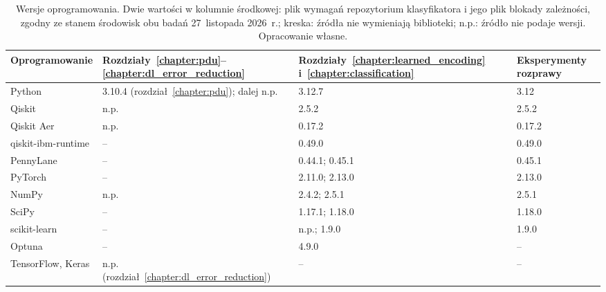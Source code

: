 \begin{table}[!tb]
\centering
\caption[Wersje oprogramowania]{Wersje oprogramowania.
Dwie wartości w kolumnie środkowej: plik wymagań repozytorium klasyfikatora i jego plik blokady zależności, zgodny ze stanem środowisk obu badań 27~listopada 2026~r.; kreska: źródła nie wymieniają biblioteki; n.p.: źródło nie podaje wersji.
Opracowanie własne.}
\label{tab:app:env:software}
\footnotesize
\begin{tabular}{@{}llll@{}}
\toprule
\textbf{Oprogramowanie} & \textbf{Rozdziały~\ref{chapter:pdu}--\ref{chapter:dl_error_reduction}} & \textbf{Rozdziały~\ref{chapter:learned_encoding} i~\ref{chapter:classification}} & \textbf{Eksperymenty rozprawy} \\
\midrule
Python & 3.10.4 (rozdział~\ref{chapter:pdu}); dalej n.p. & 3.12.7 & 3.12 \\
Qiskit & n.p. & 2.5.2 & 2.5.2 \\
Qiskit Aer & n.p. & 0.17.2 & 0.17.2 \\
qiskit-ibm-runtime & -- & 0.49.0 & 0.49.0 \\
PennyLane & -- & 0.44.1; 0.45.1 & 0.45.1 \\
PyTorch & -- & 2.11.0; 2.13.0 & 2.13.0 \\
NumPy & n.p. & 2.4.2; 2.5.1 & 2.5.1 \\
SciPy & -- & 1.17.1; 1.18.0 & 1.18.0 \\
scikit-learn & -- & n.p.; 1.9.0 & 1.9.0 \\
Optuna & -- & 4.9.0 & -- \\
TensorFlow, Keras & n.p. (rozdział~\ref{chapter:dl_error_reduction}) & -- & -- \\
\bottomrule
\end{tabular}
\end{table}
